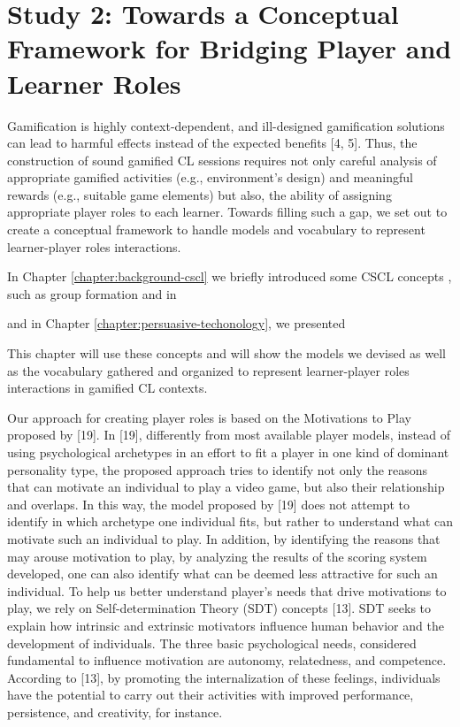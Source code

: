 

\section{Study 2: Towards a Conceptual Framework for Bridging Player and Learner Roles}

Gamification is highly context-dependent, and ill-designed gamification solutions can lead to harmful effects instead of the expected benefits [4, 5]. Thus, the construction of sound gamified CL sessions requires not only careful analysis of appropriate gamified activities (e.g., environment’s design) and meaningful rewards (e.g., suitable game elements) but also, the ability of assigning appropriate player roles to each learner. Towards filling such a gap, we set out to create a conceptual framework to handle models and vocabulary to represent learner-player roles interactions. 

In Chapter \ref{chapter:background-cscl} we briefly introduced some CSCL concepts , such as group formation and in

and in Chapter \ref{chapter:persuasive-techonology}, we presented  

This chapter will use these concepts and will show the models we devised as well as the vocabulary gathered and organized to represent learner-player roles interactions in gamified CL contexts.

Our approach for creating player roles is based on the Motivations to Play  proposed by [19]. In [19], differently from most available player models, instead of using psychological archetypes in an effort to fit a player in one kind of dominant personality type, the proposed approach tries to identify not only the reasons that can motivate an individual to play a video game,  but also their relationship and overlaps. In this way, the model proposed by [19] does not attempt to identify in which archetype one individual fits, but rather to understand what can motivate such an individual to play. In addition, by identifying the reasons that may arouse motivation to play, by analyzing the results of the scoring system developed, one can also identify what can be deemed less attractive for such an individual. 
To help us better understand player’s needs that drive motivations to play, we rely on Self-determination Theory (SDT) concepts [13]. SDT seeks to explain how intrinsic and extrinsic motivators influence human behavior and the development of individuals. The three basic psychological needs, considered fundamental to influence motivation are autonomy, relatedness, and competence. According to [13], by promoting the internalization of these feelings, individuals have the potential to carry out their activities with improved performance, persistence, and creativity, for instance. 

